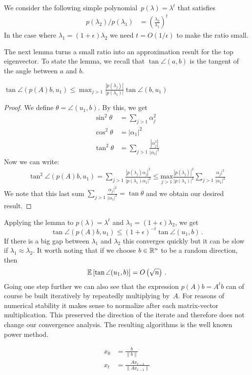 We consider the following simple polynomial~$p(\lambda)=\lambda^t$ that 
satisfies
\begin{align*}
    p(\lambda_2)/p(\lambda_1) &= \left(\frac{\lambda_2}{\lambda_1}\right)^t
\end{align*}
In the case where $\lambda_1=(1+\epsilon)\lambda_2$ we need $t=O(1/\epsilon)$ 
to make the ratio small.

The next lemma turns a small ratio into an approximation result for the
top eigenvector. To state the lemma, we recall that $\tan \angle (a,b)$ is the
tangent of the angle between $a$ and $b.$

\begin{lemma}
$\tan \angle(p(A)b, u_1) \leq \max_{j>1} \frac{|p(\lambda_j)|}{|p(\lambda_1)|}
\tan \angle (b, u_1)$
\end{lemma}

\begin{proof}
We define $\theta = \angle (u_1,b)$. By this, we get
\begin{align*}
    \sin ^2 \theta &=  \sum_{j >1} \alpha_j^2 \\
    \cos ^2 \theta &= |\alpha_1|^2 \\
    \tan^2 \theta &= \sum_{j > 1} \frac{|\alpha_j^2|}{|\alpha_1|^2}
\end{align*}
Now we can write:
\begin{align*}
    \tan^2 \angle (p(A)b, u_1) = \sum_{j>1}
\frac{|p(\lambda_j)\alpha_j|^2}{|p(\lambda_1)\alpha_1|^2} \leq
\underset{j>1}{\text{max}} \frac{|p(\lambda_j)|^2}{|p(\lambda_1)|^2} \sum_{j>1} \frac{\alpha_j |^2}{|\alpha_1| ^2}
\end{align*}
We note that this last sum $ \sum_{j > 1} \frac{\alpha_j |^2}{|\alpha_1| ^2}= \tan \theta$ and we obtain our desired result.
\end{proof}
Applying the lemma to $p(\lambda) = \lambda^t$ and $\lambda_1 =
(1+\epsilon) \lambda_2$, we get  
\[
\tan \angle(p(A)b, u_1) \leq
(1+\epsilon)^{-t} \tan \angle(u_1, b)\,.
\]
If there is a big gap between
$\lambda_1$ and $\lambda_2$ this converges quickly but it can be slow if
$\lambda_1 \approx \lambda_2$. It worth noting that if we choose $b\in\mathbb{R}^n$ to be a
random direction, then
\[
\operatorname*{\mathbb{E}}\left[\tan\angle(u_1,b)\right]=O\left(\sqrt{n}\right)\,.
\]
Going one step further we can also see that the expression $p(A)b=A^tb$ can of
course be built iteratively by repeatedly multiplying by~$A.$ For reasons of
numerical stability it makes sense to normalize after each matrix-vector
multiplication. This preserved the direction of the iterate and therefore does
not change our convergence analysis. The resulting algorithms is the well known
power method.
%
\begin{definition}
\begin{align*}
x_0 &= \frac{b}{\|b\|} \\
x_t &= \frac{A x_{t-1}}{\|Ax_{t-1}\|}
\end{align*}
\end{definition}
%
